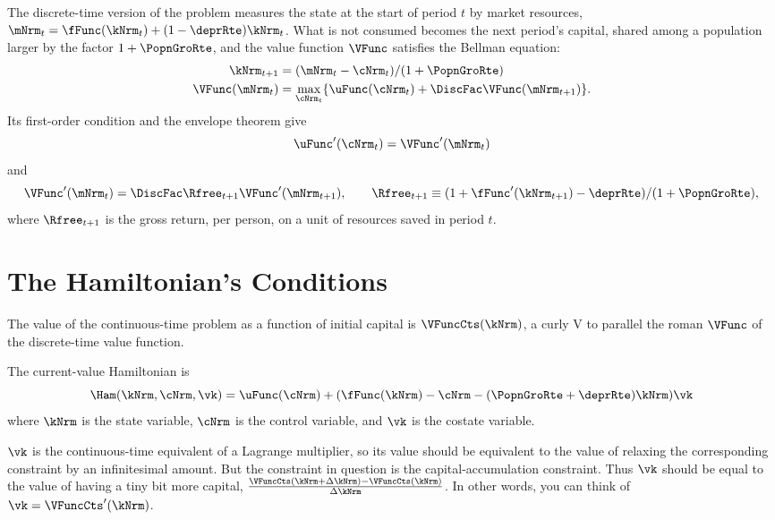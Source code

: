 \documentclass{econark}
\begin{document}
The discrete-time version of the problem measures the state at the start of period $t$ by market resources, $\mNrm_{t} = \fFunc(\kNrm_{t}) + (1-\deprRte)\kNrm_{t}$. What is not consumed becomes the next period's capital, shared among a population larger by the factor $1+\PopnGroRte$, and the value function $\VFunc$ satisfies the Bellman equation:
\begin{equation}\begin{gathered}\begin{aligned}
        \kNrm_{t+1} & =  (\mNrm_{t}-\cNrm_{t})/(1+\PopnGroRte)
\\      \VFunc(\mNrm_{t}) & =  \max_{\cNrm_{t}} \{\uFunc(\cNrm_{t}) + \DiscFac \VFunc(\mNrm_{t+1})\} .
\end{aligned}\end{gathered}\label{eq:HVD-bellman}\end{equation}
Its first-order condition and the envelope theorem give
\begin{equation}
  \uFunc^{\prime}(\cNrm_{t}) = \VFunc^{\prime}(\mNrm_{t}) \label{eq:HVD-discFOC}
\end{equation}
and
\begin{equation}
  \VFunc^{\prime}(\mNrm_{t}) = \DiscFac \Rfree_{t+1} \VFunc^{\prime}(\mNrm_{t+1}), \qquad \Rfree_{t+1} \equiv (1+\fFunc^{\prime}(\kNrm_{t+1})-\deprRte)/(1+\PopnGroRte), \label{eq:HVD-discEuler}
\end{equation}
where $\Rfree_{t+1}$ is the gross return, per person, on a unit of resources saved in period $t$.

\section{The Hamiltonian's Conditions}

The value of the continuous-time problem as a function of initial capital is $\VFuncCts(\kNrm)$, a curly V to parallel the roman $\VFunc$ of the discrete-time value function.

The current-value Hamiltonian is
\begin{equation}
  \Ham(\kNrm,\cNrm,\vk) = \uFunc(\cNrm) + (\fFunc(\kNrm)-\cNrm-(\PopnGroRte+\deprRte)\kNrm)\vk \label{eq:hamilt}
\end{equation}
where $\kNrm$ is the state variable, $\cNrm$ is the control variable, and
$\vk$ is the costate variable.

$\vk$ is the continuous-time equivalent of a Lagrange
multiplier, so its value should be equivalent to the value of relaxing
the corresponding constraint by an infinitesimal amount. But the
constraint in question is the capital-accumulation constraint. Thus
$\vk$ should be equal to the value of having a tiny bit more
capital, $\frac{\VFuncCts(\kNrm+\Delta \kNrm)-\VFuncCts(\kNrm)}{\Delta \kNrm}$. In other words,
you can think of $\vk=\VFuncCts'(\kNrm)$.
\end{document}
